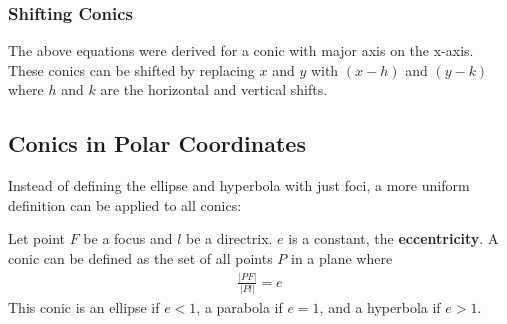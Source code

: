 \documentclass{article}
\begin{document}
\subsubsection{Shifting Conics}
The above equations were derived for a conic with major axis on the x-axis. These conics can be shifted by replacing $x$ and $y$ with $(x-h)$ and $(y-k)$ where $h$ and $k$ are the horizontal and vertical shifts.
\subsection{Conics in Polar Coordinates}
Instead of defining the ellipse and hyperbola with just foci, a more uniform definition can be applied to all conics:

Let point $F$ be a focus and $l$ be a directrix. $e$ is a constant, the \textbf{eccentricity}. A conic can be defined as the set of all points $P$ in a plane where
\begin{gather*}
    \frac{|PF|}{|Pl|} = e
\end{gather*}
This conic is an ellipse if $e < 1$, a parabola if $e = 1$, and a hyperbola if $e > 1$.
\end{document}
